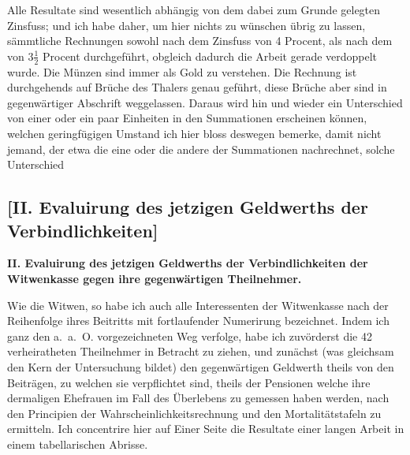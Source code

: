 \documentclass[12pt,a4paper]{article}
\begin{document}
Alle Resultate sind wesentlich abhängig von dem dabei zum Grunde gelegten Zinsfuss; und ich habe daher, um hier nichts zu wünschen übrig zu lassen, sämmtliche Rechnungen sowohl nach dem Zinsfuss von 4 Procent, als nach dem von $3\frac{1}{2}$ Procent durchgeführt, obgleich dadurch die Arbeit gerade verdoppelt wurde. Die Münzen sind immer als Gold zu verstehen. Die Rechnung ist durchgehends auf Brüche des Thalers genau geführt, diese Brüche aber sind in gegenwärtiger Abschrift weggelassen. Daraus wird hin und wieder ein Unterschied von einer oder ein paar Einheiten in den Summationen erscheinen können, welchen geringfügigen Umstand ich hier bloss deswegen bemerke, damit nicht jemand, der etwa die eine oder die andere der Summationen nachrechnet, solche Unterschied

\subsection*{[II. Evaluirung des jetzigen Geldwerths der Verbindlichkeiten]}

\textbf{II. Evaluirung des jetzigen Geldwerths der Verbindlichkeiten der Witwenkasse gegen ihre gegenwärtigen Theilnehmer.}

Wie die Witwen, so habe ich auch alle Interessenten der Witwenkasse nach der Reihenfolge ihres Beitritts mit fortlaufender Numerirung bezeichnet. Indem ich ganz den a.~a.~O. vorgezeichneten Weg verfolge, habe ich zuvörderst die 42 verheiratheten Theilnehmer in Betracht zu ziehen, und zunächst (was gleichsam den Kern der Untersuchung bildet) den gegenwärtigen Geldwerth theils von den Beiträgen, zu welchen sie verpflichtet sind, theils der Pensionen welche ihre dermaligen Ehefrauen im Fall des Überlebens zu gemessen haben werden, nach den Principien der Wahrscheinlichkeitsrechnung und den Mortalitätstafeln zu ermitteln. Ich concentrire hier auf Einer Seite die Resultate einer langen Arbeit in einem tabellarischen Abrisse.
\end{document}
